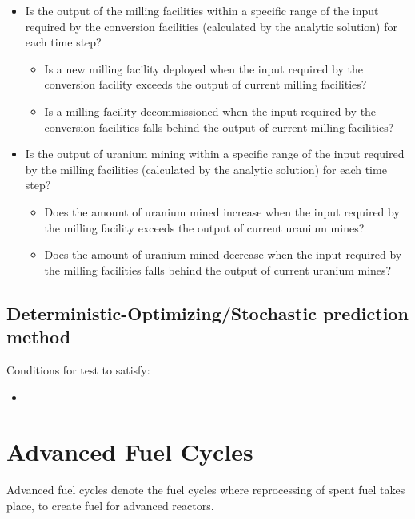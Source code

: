 \documentclass[12pt,letterpaper]{article}
\begin{document}
\begin{itemize}
\begin{itemize}
\end{itemize}
\item Is the output of the milling facilities within a specific range of the input required by the conversion facilities (calculated by the analytic solution) for each time step? 
\begin{itemize}
\item Is a new milling facility deployed when the input required by the conversion facility exceeds the output of current milling facilities?
\item Is a milling facility decommissioned when the input required by the conversion facilities falls behind the output of current milling facilities?
\end{itemize}
\item Is the output of uranium mining within a specific range of the input required by the milling facilities (calculated by the analytic solution) for each time step? 
\begin{itemize}
\item Does the amount of uranium mined increase when the input required by the milling facility exceeds the output of current uranium mines?
\item Does the amount of uranium mined decrease when the input required by the milling facilities falls behind the output of current uranium mines?
\end{itemize}
\end{itemize}

\subsection*{Deterministic-Optimizing/Stochastic prediction method}
Conditions for test to satisfy: 
\begin{itemize}
\item 
\end{itemize}


\section{Advanced Fuel Cycles}
Advanced fuel cycles denote the fuel cycles
where reprocessing of spent fuel takes place,
to create fuel for advanced reactors. 
\end{document}
